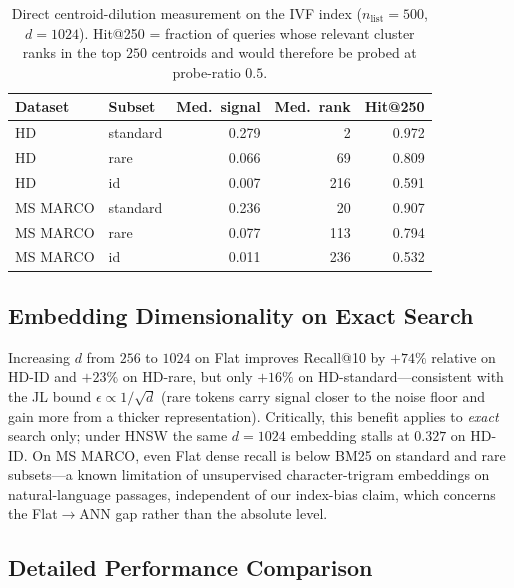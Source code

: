 \documentclass[conference]{IEEEtran}
\begin{document}
\begin{table}[t]
\centering
\small
\caption{Direct centroid-dilution measurement on the IVF index ($n_{\text{list}}{=}500$, $d{=}1024$). Hit@250 = fraction of queries whose relevant cluster ranks in the top $250$ centroids and would therefore be probed at probe-ratio $0.5$.}
\label{tab:centroid-stats}
\setlength{\tabcolsep}{4pt}
\begin{tabular}{llrrr}
\toprule
\textbf{Dataset} & \textbf{Subset} & \textbf{Med.\ signal} & \textbf{Med.\ rank} & \textbf{Hit@250} \\
\midrule
HD       & standard & 0.279 &   2 & 0.972 \\
HD       & rare     & 0.066 &  69 & 0.809 \\
HD       & id       & 0.007 & 216 & 0.591 \\
\midrule
MS MARCO & standard & 0.236 &  20 & 0.907 \\
MS MARCO & rare     & 0.077 & 113 & 0.794 \\
MS MARCO & id       & 0.011 & 236 & 0.532 \\
\bottomrule
\end{tabular}
\end{table}

\subsection{Embedding Dimensionality on Exact Search}

Increasing $d$ from $256$ to $1024$ on Flat improves Recall@10 by $+74\%$ relative on HD-ID and $+23\%$ on HD-rare, but only $+16\%$ on HD-standard---consistent with the JL bound $\epsilon\!\propto\!1/\sqrt{d}$ (rare tokens carry signal closer to the noise floor and gain more from a thicker representation). Critically, this benefit applies to \emph{exact} search only; under HNSW the same $d{=}1024$ embedding stalls at $0.327$ on HD-ID. On MS MARCO, even Flat dense recall is below BM25 on standard and rare subsets---a known limitation of unsupervised character-trigram embeddings on natural-language passages, independent of our index-bias claim, which concerns the Flat$\to$ANN gap rather than the absolute level.

\subsection{Detailed Performance Comparison}
\end{document}
